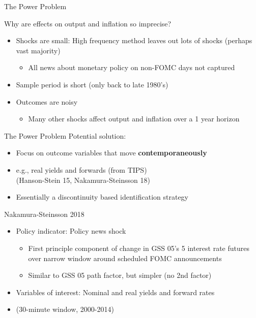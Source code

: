 \documentclass[11pt,aspectratio=169,xcolor={dvipsnames},hyperref={pdftex,pdfpagemode=UseNone,hidelinks,pdfdisplaydoctitle=true},usepdftitle=false]{beamer}
\begin{document}
\begin{frame}{The Power Problem}

Why are effects on output and inflation so imprecise?
\begin{itemize}
\item Shocks are small:  High frequency method leaves out lots of shocks (perhaps vast majority)
\begin{itemize}			
\item All news about monetary policy on non-FOMC days not captured
\end{itemize}
\item Sample period is short (only back to late 1980's)
\item Outcomes are noisy
\begin{itemize}
\item Many other shocks affect output and inflation over a 1 year horizon
\end{itemize}
\end{itemize}
\end{frame}


\begin{frame}{The Power Problem}
Potential solution: 
\begin{itemize}
\item Focus on outcome variables that move \textbf{contemporaneously}
\item[] e.g., real yields and forwards (from TIPS) \\ (Hanson-Stein 15, Nakamura-Steinsson 18)
\item Essentially a discontinuity based identification strategy
\end{itemize}		
\end{frame}


\begin{frame}{Nakamura-Steinsson 2018}
\begin{itemize}
	\item Policy indicator: Policy news shock
	\begin{itemize}
		\item First principle component of change in GSS 05's 5 interest rate futures \\ over narrow window around scheduled FOMC announcements 
		\item Similar to GSS 05 path factor, but simpler (no 2nd factor)
	\end{itemize}
	\item Variables of interest: Nominal and real yields and forward rates
	\item[] (30-minute window, 2000-2014)
\end{itemize}
\end{frame}
\end{document}
